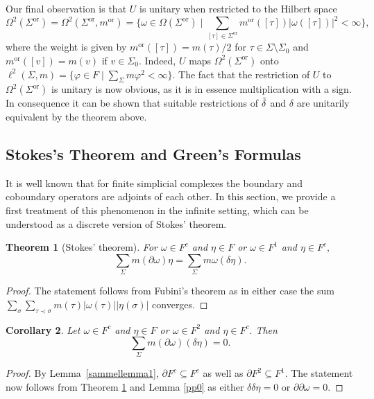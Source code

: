 \documentclass[10pt]{amsart}
\newtheorem{theorem}{Theorem}[section]
\newtheorem{corollary}[theorem]{Corollary}
\theoremstyle{definition}
\newcommand{\F}{{F}}
\begin{document}
Our final observation is that $U$ is unitary when restricted to the  Hilbert space
$$\Omega^2(\Sigma^{\mathrm{or}}) = \Omega^2(\Sigma^{\mathrm{or}},m^{\mathrm{or}}) = \lbrace\omega\in\Omega(\Sigma^{\mathrm{or}})\mid \sum_{[\tau]\in\Sigma^{\mathrm{or}}}m^{\mathrm{or}}([\tau])\vert\omega([\tau])\vert^2<\infty\rbrace,$$
where the weight is given by $m^{\mathrm{or}}([\tau]) = m(\tau)\slash 2$ for $\tau\in\Sigma\setminus \Sigma_0$ and $m^{\mathrm{or}}([v]) = m(v)$ if $v\in\Sigma_0.$ Indeed, $U$ maps $\Omega^{2}(\Sigma^{\mathrm{or}})$
 onto  $\ell^2(\Sigma,m)= \lbrace\varphi\in \F\mid \sum_{\Sigma}m\varphi^2<\infty\rbrace.$ The fact that the restriction of $U$ to $\Omega^2(\Sigma^{\mathrm{or}})$ is unitary is now obvious, as it is in essence multiplication with a sign.
In consequence it can be shown that suitable restrictions of $\Tilde{\delta}$ and $\delta$ are unitarily equivalent by the theorem above.



\subsection{Stokes's Theorem and Green's Formulas}\label{stokes}

It is well known that for finite simplicial complexes the boundary and coboundary operators are adjoints of each other. In this section, we provide a first treatment of this phenomenon in the infinite setting, which can be understood as a discrete version of Stokes' theorem. 

\begin{theorem}[Stokes' theorem]\label{adj1}
    For $\omega\in \F^c$ and $\eta\in \F$ or $\omega\in \F^1$ and $\eta\in \F^c,$ 
    $$\sum_{\Sigma}m(\partial\omega)\eta =\sum_{\Sigma}m\omega(\delta\eta).$$
\end{theorem}
\begin{proof}
    The statement follows from Fubini's theorem as in either case the sum
    $\sum_{\sigma}\sum_{\tau\prec\sigma} m(\tau)\vert\omega(\tau)\vert\vert\eta(\sigma)\vert$ 
    converges.    \end{proof}

\begin{corollary}\label{adj2}
    Let $\omega\in \F^c$ and $\eta\in \F$ or $\omega\in \F^2$ and $\eta\in \F^c.$ Then 
    $$ \sum_{\Sigma}m(\partial \omega)(\delta \eta) =0.$$
\end{corollary}
\begin{proof}
     By Lemma~\ref{sammellemma1}, $\partial \F^c\subseteq \F^c$ as well as $\partial \F^2\subseteq\F^1.$
    The statement now follows from Theorem \ref{adj1} and Lemma \ref{pp0} as either $\delta\delta\eta = 0$ or $\partial\partial\omega = 0.$
\end{proof}
\end{document}
